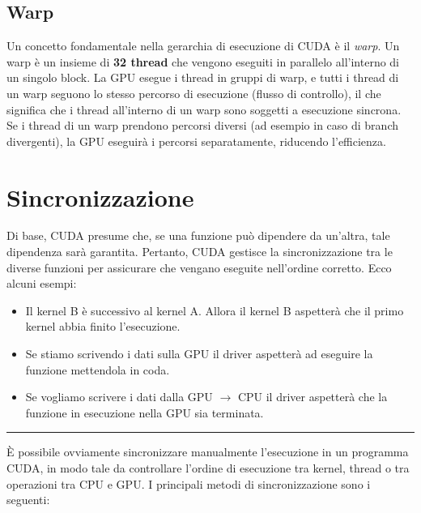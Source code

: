 \documentclass[12pt,a4paper]{report}
\begin{document}
\subsection*{Warp}
Un concetto fondamentale nella gerarchia di esecuzione di CUDA è il \textit{warp}. Un warp è un insieme di \textbf{32 thread} che vengono eseguiti in parallelo all'interno di un singolo block. La GPU esegue i thread in gruppi di warp, e tutti i thread di un warp seguono lo stesso percorso di esecuzione (flusso di controllo), il che significa che i thread all'interno di un warp sono soggetti a esecuzione sincrona. Se i thread di un warp prendono percorsi diversi (ad esempio in caso di branch divergenti), la GPU eseguirà i percorsi separatamente, riducendo l'efficienza.


\section{Sincronizzazione}

Di base, CUDA presume che, se una funzione può dipendere da un'altra, tale dipendenza sarà garantita. Pertanto, CUDA gestisce la sincronizzazione tra le diverse funzioni per assicurare che vengano eseguite nell'ordine corretto.
Ecco alcuni esempi:

\begin{itemize}
    \item Il kernel B è successivo al kernel A. Allora il kernel B aspetterà che il primo kernel abbia finito l'esecuzione.
    \item Se stiamo scrivendo i dati sulla GPU il driver aspetterà ad eseguire la funzione mettendola in coda.
    \item Se vogliamo scrivere i dati dalla GPU \(\rightarrow\) CPU il driver aspetterà che la funzione in esecuzione nella GPU sia terminata.
\end{itemize}

\vspace{8mm}
\hrule
\vspace{3mm}

È possibile ovviamente sincronizzare manualmente l'esecuzione in un programma CUDA, in modo tale da controllare l'ordine di esecuzione tra kernel, thread o tra operazioni tra CPU e GPU.  I principali metodi di sincronizzazione sono i seguenti:
\end{document}
